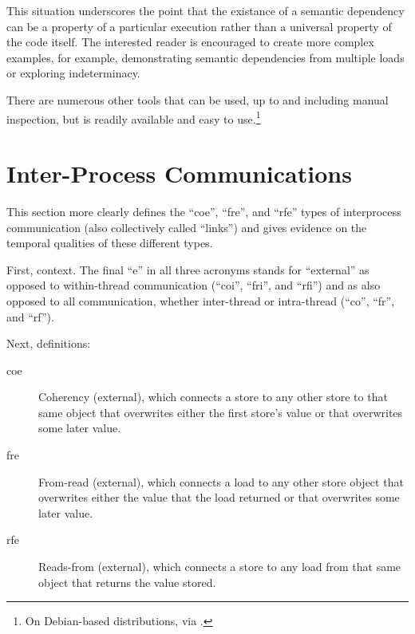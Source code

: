 \documentclass[10]{article}
\begin{document}
This situation underscores the point that the existance of a semantic
dependency can be a property of a particular execution rather than a
universal property of the code itself.
The interested reader is encouraged to create more complex examples,
for example, demonstrating semantic dependencies from multiple loads or
exploring indeterminacy.

There are numerous other tools that can be used, up to and including
manual inspection, but  is readily available and easy to
use.\footnote{
	On Debian-based distributions, via .}

\clearpage

\section{Inter-Process Communications}
\label{app:Inter-Process Communications}

This section more clearly defines the ``coe'', ``fre'', and ``rfe''
types of interprocess communication (also collectively called ``links'')
and gives evidence on the temporal qualities of these different types.

First, context.
The final ``e'' in all three acronyms stands for ``external'' as opposed
to within-thread communication (``coi'', ``fri'', and ``rfi'') and as
also opposed to all communication, whether inter-thread or intra-thread
(``co'', ``fr'', and ``rf'').

Next, definitions:

\begin{description}
\item[coe]
	Coherency (external), which connects a store to any other store
	to that same object that overwrites either the first store's
	value or that overwrites some later value.
\item[fre]
	From-read (external), which connects a load to any other store
	object that overwrites either the value that the load returned
	or that overwrites some later value.
\item[rfe]
	Reads-from (external), which connects a store to any load from
	that same object that returns the value stored.
\end{description}
\end{document}
